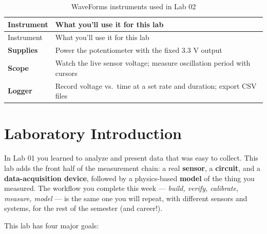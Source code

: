 \documentclass[
  12pt,
  letterpaper,
]{article}
\begin{document}
\begin{longtable}[]{@{}
  >{\raggedright\arraybackslash}p{}
  >{\raggedright\arraybackslash}p{}@{}}
\caption{WaveForms instruments used in Lab 02}\tabularnewline
\toprule\noalign{}
\begin{minipage}[b]{\linewidth}\raggedright
Instrument
\end{minipage} & \begin{minipage}[b]{\linewidth}\raggedright
What you'll use it for this lab
\end{minipage} \\
\midrule\noalign{}
\endfirsthead
\toprule\noalign{}
\begin{minipage}[b]{\linewidth}\raggedright
Instrument
\end{minipage} & \begin{minipage}[b]{\linewidth}\raggedright
What you'll use it for this lab
\end{minipage} \\
\midrule\noalign{}
\endhead
\bottomrule\noalign{}
\endlastfoot
\textbf{Supplies} & Power the potentiometer with the fixed 3.3 V
output \\
\textbf{Scope} & Watch the live sensor voltage; measure oscillation
period with cursors \\
\textbf{Logger} & Record voltage vs.~time at a set rate and duration;
export CSV files \\
\end{longtable}

\newpage{}

\section{Laboratory Introduction}\label{laboratory-introduction}

In Lab 01 you learned to analyze and present data that was easy to
collect. This lab adds the front half of the measurement chain: a real
\textbf{sensor}, a \textbf{circuit}, and a \textbf{data-acquisition
device}, followed by a physics-based \textbf{model} of the thing you
measured. The workflow you complete this week --- \emph{build, verify,
calibrate, measure, model} --- is the same one you will repeat, with
different sensors and systems, for the rest of the semester (and
career!).

This lab has four major goals:
\end{document}
